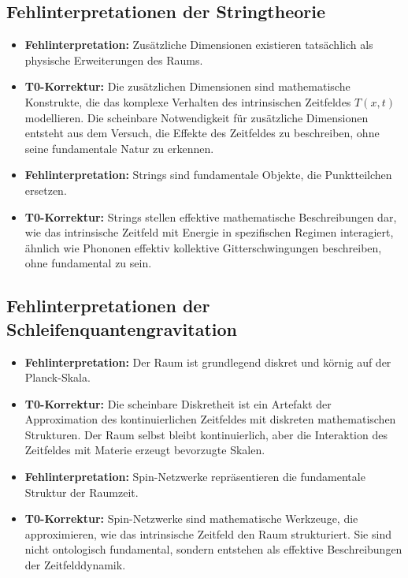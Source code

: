 \documentclass[12pt,a4paper]{article}
\newcommand{\Tfieldt}{T(x,t)}
\begin{document}
	\subsection{Fehlinterpretationen der Stringtheorie}
	\label{subsec:string_misinterpretations}
	
	\begin{itemize}
		\item \textbf{Fehlinterpretation:} Zusätzliche Dimensionen existieren tatsächlich als physische Erweiterungen des Raums.
		\item \textbf{T0-Korrektur:} Die zusätzlichen Dimensionen sind mathematische Konstrukte, die das komplexe Verhalten des intrinsischen Zeitfeldes $\Tfieldt$ modellieren. Die scheinbare Notwendigkeit für zusätzliche Dimensionen entsteht aus dem Versuch, die Effekte des Zeitfeldes zu beschreiben, ohne seine fundamentale Natur zu erkennen.
		
		\item \textbf{Fehlinterpretation:} Strings sind fundamentale Objekte, die Punktteilchen ersetzen.
		\item \textbf{T0-Korrektur:} Strings stellen effektive mathematische Beschreibungen dar, wie das intrinsische Zeitfeld mit Energie in spezifischen Regimen interagiert, ähnlich wie Phononen effektiv kollektive Gitterschwingungen beschreiben, ohne fundamental zu sein.
	\end{itemize}
	
	\subsection{Fehlinterpretationen der Schleifenquantengravitation}
	\label{subsec:lqg_misinterpretations}
	
	\begin{itemize}
		\item \textbf{Fehlinterpretation:} Der Raum ist grundlegend diskret und körnig auf der Planck-Skala.
		\item \textbf{T0-Korrektur:} Die scheinbare Diskretheit ist ein Artefakt der Approximation des kontinuierlichen Zeitfeldes mit diskreten mathematischen Strukturen. Der Raum selbst bleibt kontinuierlich, aber die Interaktion des Zeitfeldes mit Materie erzeugt bevorzugte Skalen.
		
		\item \textbf{Fehlinterpretation:} Spin-Netzwerke repräsentieren die fundamentale Struktur der Raumzeit.
		\item \textbf{T0-Korrektur:} Spin-Netzwerke sind mathematische Werkzeuge, die approximieren, wie das intrinsische Zeitfeld den Raum strukturiert. Sie sind nicht ontologisch fundamental, sondern entstehen als effektive Beschreibungen der Zeitfelddynamik.
	\end{itemize}
	
\end{document}
